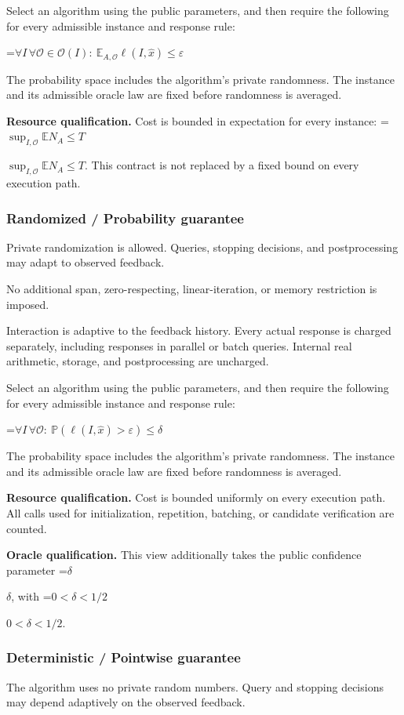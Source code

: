 \documentclass[10pt,a4paper]{article}
\newcommand{\AtlasMath}[1]{\par\begingroup\centering\setbox0=\hbox{$\displaystyle #1$}\ifdim\wd0>1.4\linewidth\typeout{ATLAS WIDE FORMULA: \the\wd0}\fi\ifdim\wd0>\linewidth\resizebox{\linewidth}{!}{\box0}\else\box0\fi\par\endgroup}
\newcommand{\AtlasInlineMath}[1]{\begingroup\setbox0=\hbox{$#1$}\ifdim\wd0>.4\linewidth\endgroup\AtlasMath{#1}\else\endgroup$#1$\fi}
\begin{document}
Select an algorithm using the public parameters, and then require the following for every admissible instance and response rule:


\AtlasMath{\forall I\,\forall\mathcal{O}\in\mathcal{O}(I):\ \mathbb{E}_{A,\mathcal{O}}\ell(I,\widehat{x})\le\varepsilon}


The probability space includes the algorithm's private randomness. The instance and its admissible oracle law are fixed before randomness is averaged.

\textbf{Resource qualification.} Cost is bounded in expectation for every instance: \AtlasInlineMath{\sup_{I,\mathcal O}\mathbb E N_A\le T}. This contract is not replaced by a fixed bound on every execution path.

\subsubsection{Randomized / Probability guarantee}
Private randomization is allowed. Queries, stopping decisions, and postprocessing may adapt to observed feedback.

No additional span, zero-respecting, linear-iteration, or memory restriction is imposed.

Interaction is adaptive to the feedback history. Every actual response is charged separately, including responses in parallel or batch queries. Internal real arithmetic, storage, and postprocessing are uncharged.

Select an algorithm using the public parameters, and then require the following for every admissible instance and response rule:


\AtlasMath{\forall I\,\forall\mathcal{O}:\ \mathbb{P}(\ell(I,\widehat{x})>\varepsilon)\le\delta}


The probability space includes the algorithm's private randomness. The instance and its admissible oracle law are fixed before randomness is averaged.

\textbf{Resource qualification.} Cost is bounded uniformly on every execution path. All calls used for initialization, repetition, batching, or candidate verification are counted.

\textbf{Oracle qualification.} This view additionally takes the public confidence parameter \AtlasInlineMath{\delta}, with \AtlasInlineMath{0<\delta<1/2}.

\subsubsection{Deterministic / Pointwise guarantee}
The algorithm uses no private random numbers. Query and stopping decisions may depend adaptively on the observed feedback.
\end{document}
